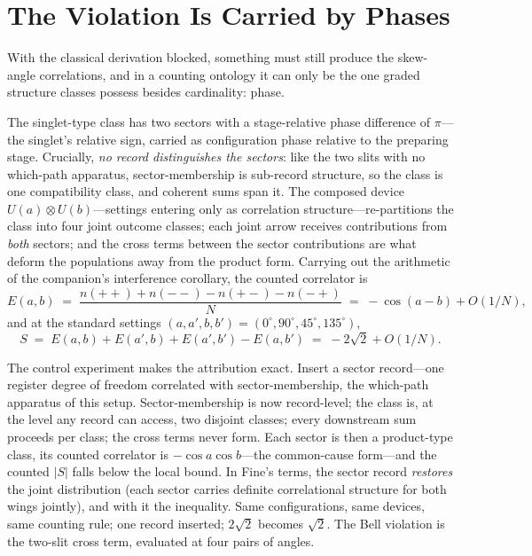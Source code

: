 \documentclass[11pt]{article}
\theoremstyle{definition}
\theoremstyle{remark}
\begin{document}
\section{The Violation Is Carried by Phases}\label{sec:phases}
With the classical derivation blocked, something must still produce the skew-angle correlations, and in a counting ontology it can only be the one graded structure classes possess besides cardinality: phase.

The singlet-type class has two sectors with a stage-relative phase difference of $\pi$---the singlet's relative sign, carried as configuration phase relative to the preparing stage. Crucially, \emph{no record distinguishes the sectors}: like the two slits with no which-path apparatus, sector-membership is sub-record structure, so the class is one compatibility class, and coherent sums span it. The composed device $U(a) \otimes U(b)$---settings entering only as correlation structure---re-partitions the class into four joint outcome classes; each joint arrow receives contributions from \emph{both} sectors; and the cross terms between the sector contributions are what deform the populations away from the product form. Carrying out the arithmetic of the companion's interference corollary, the counted correlator is
\[ E(a,b) \;=\; \frac{n({+}{+}) + n({-}{-}) - n({+}{-}) - n({-}{+})}{N} \;=\; -\cos(a-b) + O(1/N), \]
and at the standard settings $(a, a', b, b') = (0^\circ, 90^\circ, 45^\circ, 135^\circ)$,
\[ S \;=\; E(a,b) + E(a',b) + E(a',b') - E(a,b') \;=\; -2\sqrt{2} + O(1/N). \]

The control experiment makes the attribution exact. Insert a sector record---one register degree of freedom correlated with sector-membership, the which-path apparatus of this setup. Sector-membership is now record-level; the class is, at the level any record can access, two disjoint classes; every downstream sum proceeds per class; the cross terms never form. Each sector is then a product-type class, its counted correlator is $-\cos a \cos b$---the common-cause form---and the counted $|S|$ falls below the local bound. In Fine's terms, the sector record \emph{restores} the joint distribution (each sector carries definite correlational structure for both wings jointly), and with it the inequality. Same configurations, same devices, same counting rule; one record inserted; $2\sqrt{2}$ becomes $\sqrt{2}$. The Bell violation is the two-slit cross term, evaluated at four pairs of angles.
\end{document}
